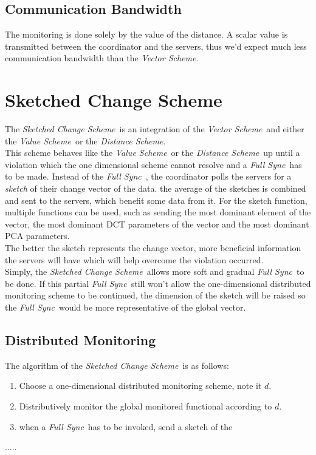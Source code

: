 \documentclass[10pt, conference]{IEEEtran}
\newcommand{\vectorScheme}{\textit{Vector Scheme}}
\newcommand{\valueScheme}{\textit{Value Scheme}}
\newcommand{\distanceScheme}{\textit{Distance Scheme}}
\newcommand{\sketchScheme}{\textit{Sketched Change Scheme}}
\newcommand{\fullSync}{\textit{Full Sync}}
\begin{document}
\subsection{Communication Bandwidth}
The monitoring is done solely by the value of the distance. A scalar value is transmitted between the coordinator and the servers, thus we'd expect much less communication bandwidth than the \vectorScheme .

\section{Sketched Change Scheme}
The \sketchScheme \ is an integration of the \vectorScheme \ and either the \valueScheme \ or the \distanceScheme . \\
This scheme behaves like the \valueScheme \ or the \distanceScheme \ up until a violation which the one dimensional scheme cannot resolve and a \fullSync \ has to be made. Instead of the \fullSync \ , the coordinator polls the servers for a \textit{sketch} of their change vector of the data. the average of the sketches is combined and sent to the servers, which benefit some data from it. For the sketch function, multiple functions can be used, such as sending the most dominant element of the vector, the most dominant DCT parameters of the vector and the most dominant PCA parameters. \\
The better the sketch represents the change vector, more beneficial information the servers will have which will help overcome the violation occurred. \\
Simply, the \sketchScheme \ allows more soft and gradual \fullSync \ to be done. If this partial \fullSync \ still won't allow the one-dimensional distributed monitoring scheme to be continued, the dimension of the sketch will be raised so the \fullSync \ would be more representative of the global vector. \\
\subsection{Distributed Monitoring}
The algorithm of the \sketchScheme \ is as follows:
\begin{enumerate}
\item Choose a one-dimensional distributed monitoring scheme, note it $d$.
\item Distributively monitor the global monitored functional according to $d$.
\item when a \fullSync \ has to be invoked, send a sketch of the 
\end{enumerate}
.....
\end{document}
